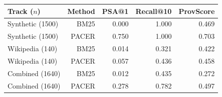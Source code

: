 \begin{tabular}{lrrrr}
\hline
Track ($n$) & Method & PSA@1 & Recall@10 & ProvScore \\
\hline
Synthetic (1500) & BM25 & 0.000 & 1.000 & 0.469 \\
Synthetic (1500) & PACER & 0.750 & 1.000 & 0.703 \\
Wikipedia (140) & BM25 & 0.014 & 0.321 & 0.422 \\
Wikipedia (140) & PACER & 0.057 & 0.436 & 0.458 \\
Combined (1640) & BM25 & 0.012 & 0.435 & 0.272 \\
Combined (1640) & PACER & 0.278 & 0.782 & 0.497 \\
\hline
\end{tabular}

